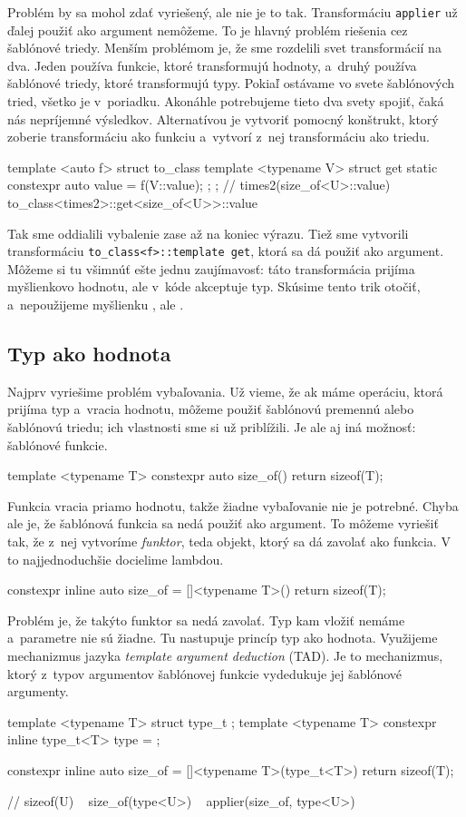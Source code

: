 Problém by sa mohol zdať vyriešený, ale nie je to tak. Transformáciu \texttt{applier} už ďalej použiť ako argument nemôžeme. To je hlavný problém riešenia cez šablónové triedy. Menším problémom je, že sme rozdelili svet transformácií na dva. Jeden používa funkcie, ktoré transformujú hodnoty, a~druhý používa šablónové triedy, ktoré transformujú typy. Pokiaľ ostávame vo svete šablónových tried, všetko je v~poriadku. Akonáhle potrebujeme tieto dva svety spojiť, čaká nás nepríjemné  výsledkov. Alternatívou je vytvoriť pomocný konštrukt, ktorý zoberie transformáciu ako funkciu a~vytvorí z~nej transformáciu ako triedu.
\begin{code}
template <auto f> struct to_class
{   template <typename V> struct get
    { static constexpr auto value = f(V::value); };
};
// times2(size_of<U>::value) ~ to_class<times2>::get<size_of<U>>::value
\end{code}
Tak sme oddialili vybalenie zase až na koniec výrazu. Tiež sme vytvorili transformáciu \texttt{to\_class<f>::template get}, ktorá sa dá použiť ako argument. Môžeme si tu všimnúť ešte jednu zaujímavosť: táto transformácia prijíma myšlienkovo hodnotu, ale v~kóde akceptuje typ. Skúsime tento trik otočiť, a~nepoužijeme myšlienku , ale .

\subsection{Typ ako hodnota}

Najprv vyriešime problém vybaľovania. Už vieme, že ak máme operáciu, ktorá prijíma typ a~vracia hodnotu, môžeme použiť šablónovú premennú alebo šablónovú triedu; ich vlastnosti sme si už priblížili. Je ale aj iná možnosť: šablónové funkcie.
\begin{code}
template <typename T> constexpr auto size_of() { return sizeof(T); }
\end{code}
Funkcia vracia priamo hodnotu, takže žiadne vybaľovanie nie je potrebné. Chyba ale je, že šablónová funkcia sa nedá použiť ako argument. To môžeme vyriešiť tak, že z~nej vytvoríme \emph{funktor}, teda objekt, ktorý sa dá zavolať ako funkcia. V~\Cpp{} to najjednoduchšie docielime lambdou.
\begin{code}
constexpr inline auto size_of = []<typename T>() { return sizeof(T); }
\end{code}
Problém je, že takýto funktor sa nedá zavolať. Typ kam vložiť nemáme a~parametre nie sú žiadne. Tu nastupuje princíp typ ako hodnota. Využijeme mechanizmus jazyka \emph{template argument deduction} (TAD). Je to mechanizmus, ktorý z~typov argumentov šablónovej funkcie vydedukuje jej šablónové argumenty.
\begin{code}
template <typename T> struct type_t {};
template <typename T> constexpr inline type_t<T> type = {};

constexpr inline auto size_of = []<typename T>(type_t<T>)
                                { return sizeof(T); }
    
// sizeof(U) ~ size_of(type<U>) ~ applier(size_of, type<U>)
\end{code}

